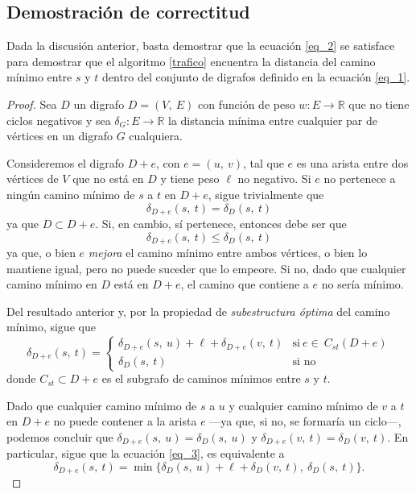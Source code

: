 \subsection{Demostración de correctitud}\label{correctitud}  

Dada la discusión anterior, basta demostrar que la ecuación \ref{eq_2} se satisface para demostrar que el algoritmo \ref{trafico} encuentra la distancia del camino mínimo entre $s$ y $t$ dentro del conjunto de digrafos definido en la ecuación \ref{eq_1}.

\begin{proof} 
    Sea $D$ un digrafo $D = (V,\ E)$ con función de peso $w: E \to \mathbb{R}$ que no tiene ciclos negativos y sea  $\delta_G : E \to \mathbb{R}$ la distancia mínima entre cualquier par de vértices en un digrafo $G$ cualquiera.

    Consideremos el digrafo $D+e$, con $e = (u,\ v)$, tal que $e$ es una arista entre dos vértices de $V$ que no está en $D$ y tiene peso $\ell$ no negativo. Si $e$ no pertenece a ningún camino mínimo de $s$ a $t$ en $D + e$, sigue trivialmente que  
    \begin{equation*}
        \delta_{D + e}(s,\ t) = \delta_{D}(s,\ t)
    \end{equation*}
    ya que $D \subset D + e$. Si, en cambio, sí pertenece, entonces debe ser que
    \begin{equation*}
        \delta_{D + e}(s,\ t) \leq \delta_{D}(s,\ t)
    \end{equation*} 
    ya que, o bien $e$ \textit{mejora} el camino mínimo entre ambos vértices, o bien lo mantiene igual, pero no puede suceder que lo empeore. Si no, dado que cualquier camino mínimo en $D$ está en $D + e$, el camino que contiene a $e$ no sería mínimo. 
    
    Del resultado anterior y, por la propiedad de \textit{subestructura óptima} del camino mínimo, sigue que
    \begin{equation}\label{eq_3}
        \delta_{D + e}(s,\ t) = \begin{cases}
            \delta_{D + e}(s,\ u) + \ell + \delta_{D + e}(v,\ t) &\text{si}\ e \in\ C_{st}(D+e)\\
            \delta_{D}(s,\ t) &\text{si no}
        \end{cases}
    \end{equation}
    donde $C_{st} \subset D + e$ es el subgrafo de caminos mínimos entre $s$ y $t$.

    Dado que cualquier camino mínimo de $s$ a $u$ y cualquier camino mínimo de $v$ a $t$ en $D + e$ no puede contener a la arista $e$ ---ya que, si no, se formaría un ciclo---, podemos concluir que $ \delta_{D + e}(s,\ u) = \delta_{D}(s,\ u) $ y $ \delta_{D + e}(v,\ t) = \delta_{D}(v,\ t)$. En particular, sigue que la ecuación \ref{eq_3}, es equivalente a
    \begin{equation*}
        \delta_{D + e}(s,\ t) = \min\{\delta_{D}(s,\ u) + \ell + \delta_{D}(v,\ t),\ \delta_{D}(s,\ t)\}.
    \end{equation*}
\end{proof}
    
